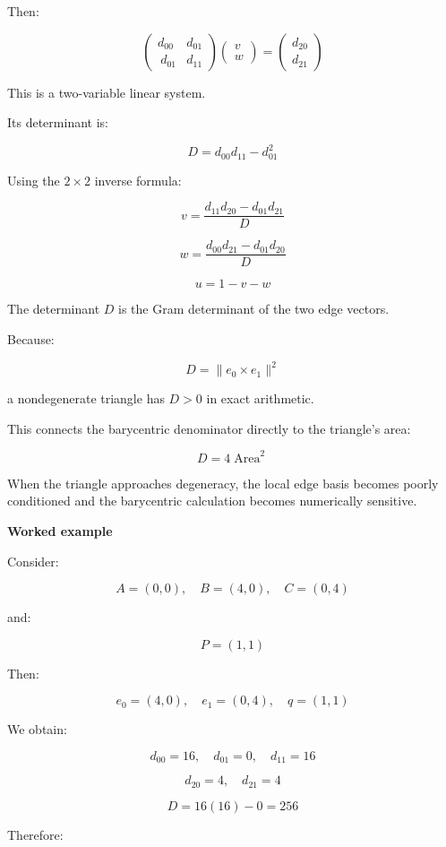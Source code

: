 Then:

\[
\begin{pmatrix} d_{00}&d_{01}\\\ d_{01}&d_{11} \end{pmatrix} \begin{pmatrix}v\\w\end{pmatrix} = \begin{pmatrix}d_{20}\\d_{21}\end{pmatrix}
\]

This is a two-variable linear system.

Its determinant is:

\[
D=d_{00}d_{11}-d_{01}^2
\]

Using the \(2\times2\) inverse formula:

\[
\boxed{ v=\frac{d_{11}d_{20}-d_{01}d_{21}}{D} }
\]

\[
\boxed{ w=\frac{d_{00}d_{21}-d_{01}d_{20}}{D} }
\]

\[
\boxed{u=1-v-w}
\]

The determinant \(D\) is the Gram determinant of the two edge vectors.

Because:

\[
D=\|e_0\times e_1\|^2
\]

a nondegenerate triangle has \(D>0\) in exact arithmetic.

This connects the barycentric denominator directly to the triangle's area:

\[
D=4\operatorname{Area}^2
\]

When the triangle approaches degeneracy, the local edge basis becomes poorly conditioned and the barycentric calculation becomes numerically sensitive.

\textbf{Worked example}

Consider:

\[
A=(0,0),\quad B=(4,0),\quad C=(0,4)
\]

and:

\[
P=(1,1)
\]

Then:

\[
e_0=(4,0),\quad e_1=(0,4),\quad q=(1,1)
\]

We obtain:

\[
d_{00}=16,\quad d_{01}=0,\quad d_{11}=16
\]

\[
d_{20}=4,\quad d_{21}=4
\]

\[
D=16(16)-0=256
\]

Therefore:

